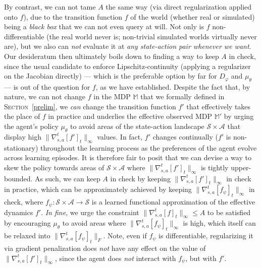 By contrast, we can not tame $A$ the same way (via direct regularization applied onto $f$),
due to the transition function $f$ of the world (whether real or simulated)
being a \emph{black box} that we can not even query at will.
Not only is $f$ non-differentiable (the real world never is; non-trivial simulated worlds virtually never are),
but we also can \emph{not} evaluate it at \textit{any state-action pair whenever we want}.
Our desideratum then ultimately boils down to finding a way to keep $A$ in check,
since the usual candidate to enforce Lipschitz-continuity (applying a regularizer on the Jacobian directly) ---
which is the preferable option by far for $D_\varphi$ and $\mu_\theta$ ---
is out of the question for $f$, as we have established.
Despite the fact that, by nature, we can not change $f$ in the MDP $\mathbb{M}$ that we formally defined
in \textsc{Section}~\ref{prelim}, we \emph{can} change the transition function $f'$ that
effectively takes the place of $f$ in practice
and underlies the effective observed MDP $\mathbb{M}'$ by urging the agent's policy $\mu_\theta$ to avoid
areas of the state-action landscape $\mathcal{S} \times \mathcal{A}$
that display high $\lVert\nabla_{s,a}^t[f']_t\rVert _\infty$ values.
In fact, $f'$ changes continually ($f'$ is non-stationary)
throughout the learning process as the preferences of the agent
evolve across learning episodes.
It is therefore fair to posit that we can devise a way to skew the policy towards areas
of $\mathcal{S} \times \mathcal{A}$ where
$\lVert\nabla_{s,a}^t[f']_t\rVert _\infty$ is tightly upper-bounded.
As such, we can keep $A$ in check by keeping $\lVert\nabla_{s,a}^t[f']_t\rVert _\infty$ in check in practice,
which can be approximately achieved by keeping $\lVert\nabla_{s,a}^t[f_\psi]_t\rVert _\infty$ in check,
where $f_\psi : \mathcal{S} \times \mathcal{A} \to \mathcal{S}$
is a learned functional approximation of the effective dynamics $f'$.
\textit{In fine},
we urge the constraint $\lVert\nabla_{s,a}^t[f]_t\rVert _\infty \leq A$ to be satisfied
by encouraging $\mu_\theta$ to avoid areas where $\lVert\nabla_{s,a}^t[f_\psi]_t\rVert _\infty$
is high, which itself can be relaxed into $\lVert\nabla_{s,a}^t[f_\psi]_t\rVert _F$.
Note, even if $f_\psi$ is differentiable, regularizing it via gradient penalization does \emph{not}
have any effect on the value of $\lVert\nabla_{s,a}^t[f']_t\rVert _\infty$,
since the agent does \emph{not} interact with $f_\psi$, but with $f'$.

